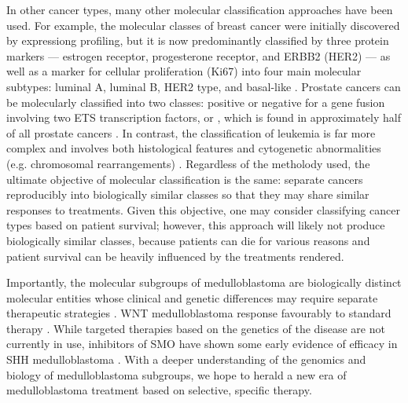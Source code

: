 In other cancer types, many other molecular classification approaches have been used. For example, the molecular classes of breast cancer were initially discovered by expressiong profiling, but it is now predominantly classified by three protein markers --- estrogen receptor, progesterone receptor, and ERBB2 (HER2) --- as well as a marker for cellular proliferation (Ki67) into four main molecular subtypes: luminal A, luminal B, HER2 type, and basal-like . Prostate cancers can be molecularly classified into two classes: positive or negative for a gene fusion involving two ETS transcription factors,  or , which is found in approximately half of all prostate cancers . In contrast, the classification of leukemia is far more complex and involves both histological features and cytogenetic abnormalities (e.g. chromosomal rearrangements) . Regardless of the metholody used, the ultimate objective of molecular classification is the same: separate cancers reproducibly into biologically similar classes so that they may share similar responses to treatments. Given this objective, one may consider classifying cancer types based on patient survival; however, this approach will likely not produce biologically similar classes, because patients can die for various reasons and patient survival can be heavily influenced by the treatments rendered.

Importantly, the molecular subgroups of medulloblastoma are biologically distinct molecular entities whose clinical and genetic differences may require separate therapeutic strategies . WNT medulloblastoma response favourably to standard therapy . While targeted therapies based on the genetics of the disease are not currently in use, inhibitors of SMO have shown some early evidence of efficacy in SHH medulloblastoma . With a deeper understanding of the genomics and biology of medulloblastoma subgroups, we hope to herald a new era of medulloblastoma treatment based on selective, specific therapy.





